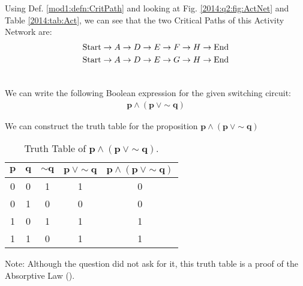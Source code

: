 \begin{subquestions}
\begin{subsubquestions}

\subsubquestion

Using Def. \ref{mod1:defn:CritPath} and looking at Fig. \ref{2014:q2:fig:ActNet} and Table \ref{2014:tab:Act}, we can see that the two Critical Paths of this Activity Network are:
\begin{align}
	\text{Start} \rightarrow A \rightarrow D \rightarrow E \rightarrow F \rightarrow H \rightarrow \text{End} \nonumber \\
	\text{Start} \rightarrow A \rightarrow D \rightarrow E \rightarrow G \rightarrow H \rightarrow \text{End} \nonumber \\ \nonumber
\end{align}
	
\end{subsubquestions}


\subquestion

\begin{subsubquestions}
	
\subsubquestion

We can write the following Boolean expression for the given switching circuit:
\begin{align}
	\boldsymbol{p \wedge (p \: \vee \sim q)} \label{2014:q2:eqn:Bool}
\end{align}


\subsubquestion

We can construct the truth table for the proposition $\boldsymbol{p \land (p ~\lor \sim q)}$
\begin{table}[ht]
	\centering
	\begin{tabular}{|c|c|c|c|c|}
		\hline
		$\boldsymbol{p}$ &$\boldsymbol{q}$ & $\boldsymbol{\sim q}$ & $\boldsymbol{p \ \vee \sim q}$ & $\boldsymbol{p \wedge ( p \ \vee \sim q)}$ \\
		\hline
		0 & 0 & 1 & 1 & 0 \\
		0 & 1 & 0 & 0 & 0 \\
		1 & 0 & 1 & 1 & 1 \\
		1 & 1 & 0 & 1 & 1 \\
		\hline
	\end{tabular}
	\caption{\label{2014:tab:TrthTab}Truth Table of $\boldsymbol{p \land (p ~\lor \sim q)}$.}
\end{table}

Note: Although the question did not ask for it, this truth table is a proof of the Absorptive Law ().

\end{subsubquestions}

\end{subquestions}
